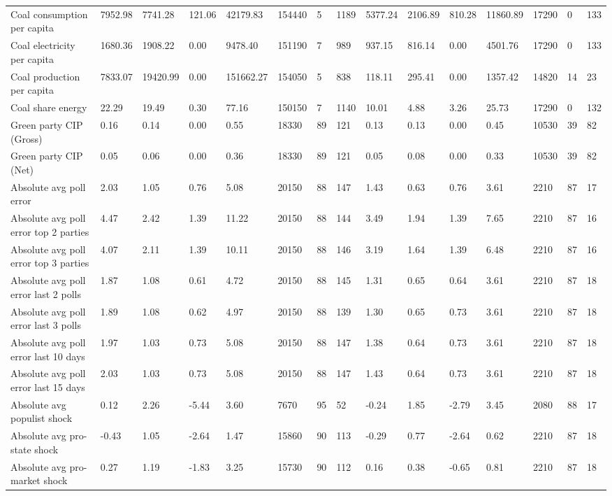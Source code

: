 \begin{longtable}{lllllllllllllll}
Coal consumption per capita & 7952.98 & 7741.28 & 121.06 & 42179.83 & 154440 & 5 & 1189 & 5377.24 & 2106.89 & 810.28 & 11860.89 & 17290 & 0 & 133\\
Coal electricity per capita & 1680.36 & 1908.22 & 0.00 & 9478.40 & 151190 & 7 & 989 & 937.15 & 816.14 & 0.00 & 4501.76 & 17290 & 0 & 133\\
Coal production per capita & 7833.07 & 19420.99 & 0.00 & 151662.27 & 154050 & 5 & 838 & 118.11 & 295.41 & 0.00 & 1357.42 & 14820 & 14 & 23\\
Coal share energy & 22.29 & 19.49 & 0.30 & 77.16 & 150150 & 7 & 1140 & 10.01 & 4.88 & 3.26 & 25.73 & 17290 & 0 & 132\\
\addlinespace
Green party CIP (Gross) & 0.16 & 0.14 & 0.00 & 0.55 & 18330 & 89 & 121 & 0.13 & 0.13 & 0.00 & 0.45 & 10530 & 39 & 82\\
Green party CIP (Net) & 0.05 & 0.06 & 0.00 & 0.36 & 18330 & 89 & 121 & 0.05 & 0.08 & 0.00 & 0.33 & 10530 & 39 & 82\\
Absolute avg poll error & 2.03 & 1.05 & 0.76 & 5.08 & 20150 & 88 & 147 & 1.43 & 0.63 & 0.76 & 3.61 & 2210 & 87 & 17\\
Absolute avg poll error top 2 parties & 4.47 & 2.42 & 1.39 & 11.22 & 20150 & 88 & 144 & 3.49 & 1.94 & 1.39 & 7.65 & 2210 & 87 & 16\\
Absolute avg poll error top 3 parties & 4.07 & 2.11 & 1.39 & 10.11 & 20150 & 88 & 146 & 3.19 & 1.64 & 1.39 & 6.48 & 2210 & 87 & 16\\
\addlinespace
Absolute avg poll error last 2 polls & 1.87 & 1.08 & 0.61 & 4.72 & 20150 & 88 & 145 & 1.31 & 0.65 & 0.64 & 3.61 & 2210 & 87 & 18\\
Absolute avg poll error last 3 polls & 1.89 & 1.08 & 0.62 & 4.97 & 20150 & 88 & 139 & 1.30 & 0.65 & 0.73 & 3.61 & 2210 & 87 & 18\\
Absolute avg poll error last 10 days & 1.97 & 1.03 & 0.73 & 5.08 & 20150 & 88 & 147 & 1.38 & 0.64 & 0.73 & 3.61 & 2210 & 87 & 18\\
Absolute avg poll error last 15 days & 2.03 & 1.03 & 0.73 & 5.08 & 20150 & 88 & 147 & 1.43 & 0.64 & 0.73 & 3.61 & 2210 & 87 & 18\\
Absolute avg populist shock & 0.12 & 2.26 & -5.44 & 3.60 & 7670 & 95 & 52 & -0.24 & 1.85 & -2.79 & 3.45 & 2080 & 88 & 17\\
\addlinespace
Absolute avg pro-state shock & -0.43 & 1.05 & -2.64 & 1.47 & 15860 & 90 & 113 & -0.29 & 0.77 & -2.64 & 0.62 & 2210 & 87 & 18\\
Absolute avg pro-market shock & 0.27 & 1.19 & -1.83 & 3.25 & 15730 & 90 & 112 & 0.16 & 0.38 & -0.65 & 0.81 & 2210 & 87 & 18\\

\end{longtable}
